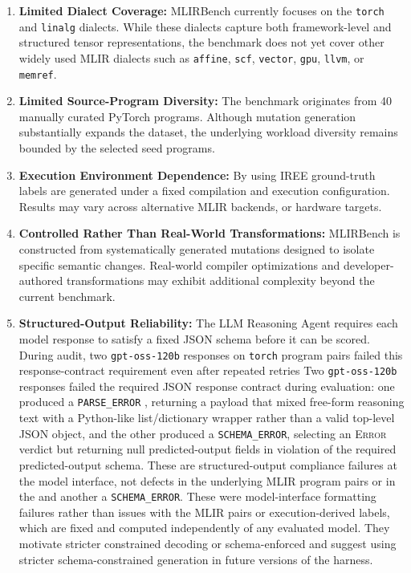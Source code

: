 \documentclass[sigplan,screen,review,anonymous]{acmart}
\providecommand{\DIFadd}[1]{{\protect\color{blue} \sf #1}} %
\providecommand{\DIFdel}[1]{{\protect\color{red} \scriptsize #1}} %
\providecommand{\DIFaddbegin}{} %
\providecommand{\DIFaddend}{} %
\providecommand{\DIFdelbegin}{} %
\providecommand{\DIFdelend}{} %
\begin{document}
\begin{enumerate}
\item \textbf{Limited Dialect Coverage:}
MLIRBench currently focuses on the \texttt{torch} and \texttt{linalg} dialects. While these dialects capture both framework-level and structured tensor representations, the benchmark does not yet cover other widely used MLIR dialects such as \texttt{affine}, \texttt{scf}, \texttt{vector}, \texttt{gpu}, \texttt{llvm}, or \texttt{memref}.

\item \textbf{Limited Source-Program Diversity:}
The benchmark originates from 40 manually curated PyTorch programs. Although mutation generation substantially expands the dataset, the underlying workload diversity remains bounded by the selected seed programs.

\item \textbf{Execution Environment Dependence:}
By using IREE ground-truth labels are generated under a fixed compilation and execution configuration. Results may vary across alternative MLIR backends, or hardware targets.

\item \textbf{Controlled Rather Than Real-World Transformations:}
MLIRBench is constructed from systematically generated mutations designed to isolate specific semantic changes. Real-world compiler optimizations and developer-authored transformations may exhibit additional complexity beyond the current benchmark.

\item \textbf{Structured-Output Reliability:}
\DIFdelbegin \DIFdel{The LLM Reasoning Agent requires each model response to satisfy a fixed JSON schema before it can be scored. During audit, two \texttt{gpt-oss-120b} responses on \texttt{torch} program pairs failed this response-contract requirement even after repeated retries}\DIFdelend \DIFaddbegin \DIFadd{Two \texttt{gpt-oss-120b} responses failed the required JSON response contract during evaluation}\DIFaddend : one produced a \texttt{PARSE\_ERROR} \DIFdelbegin \DIFdel{, returning a payload that mixed free-form reasoning text with a Python-like list/dictionary wrapper rather than a valid top-level JSON object, and the other produced a \texttt{SCHEMA\_ERROR}, selecting an \textsc{Error} verdict but returning null predicted-output fields in violation of the required predicted-output schema. These are structured-output compliance failures at the model interface, not defects in the underlying MLIR program pairs or in the }\DIFdelend \DIFaddbegin \DIFadd{and another a \texttt{SCHEMA\_ERROR}. These were model-interface formatting failures rather than issues with the MLIR pairs or }\DIFaddend execution-derived labels, \DIFdelbegin \DIFdel{which are fixed and computed independently of any evaluated model. They motivate stricter constrained decoding or schema-enforced }\DIFdelend \DIFaddbegin \DIFadd{and suggest using stricter schema-constrained }\DIFaddend generation in future versions of the harness.

\end{enumerate}
\end{document}
